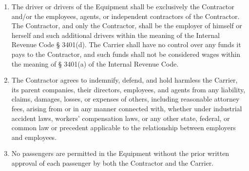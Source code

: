 \begin{enumerate}
\begin{enumerate}
        \item Self-employment taxes, withholding taxes, FICA taxes,
        unemployment compensation taxes, and any other related taxes and
        obligations.

        \item Provision of workers' compensation insurance and occupational
        accident and disability insurance for all personnel and drivers
        provided by the Contractor, including those qualified to operate
        the Equipment.

        \item The Contractor's management of their employees, agents, and
        independent contractors, including recruitment, dismissal,
        supervision, direction, training, wage setting, work hours and
        conditions, and handling of grievances.

        \item Training the Contractor's employees, agents, and independent
        contractors on the Carrier's policies, requirements, and the terms
        of this Agreement.

        \item All costs associated with commercial driver physical
        qualification tests as required under 49 CFR {\S\S} 391.41 --
        391.49 \footnote{\PhysicalQualificationsAndExaminationsFootnote},
        and any other qualification testing conducted by the Contractor.

        \item All operating costs and expenses incurred by the Contractor’s
        employees, agents, and independent contractors while operating the
        Equipment under this Agreement.
    \end{enumerate}

    \item The driver or drivers of the Equipment shall be exclusively the
    Contractor and/or the employees, agents, or independent contractors of
    the Contractor. The Contractor, and only the Contractor, shall be the
    employer of himself or herself and such additional drivers within the
    meaning of the Internal Revenue Code {\S} 3401(d). The Carrier shall
    have no control over any funds it pays to the Contractor, and such
    funds shall not be considered wages within the meaning of {\S} 3401(a)
    of the Internal Revenue Code.

    \item The Contractor agrees to indemnify, defend, and hold harmless the
    Carrier, its parent companies, their directors, employees, and agents
    from any liability, claims, damages, losses, or expenses of others,
    including reasonable attorney fees, arising from or in any manner
    connected with, whether under industrial accident laws, workers'
    compensation laws, or any other state, federal, or common law or
    precedent applicable to the relationship between employers and
    employees.

    \item No passengers are permitted in the Equipment without the prior
    written approval of each passenger by both the Contractor and the
    Carrier.
\end{enumerate}
